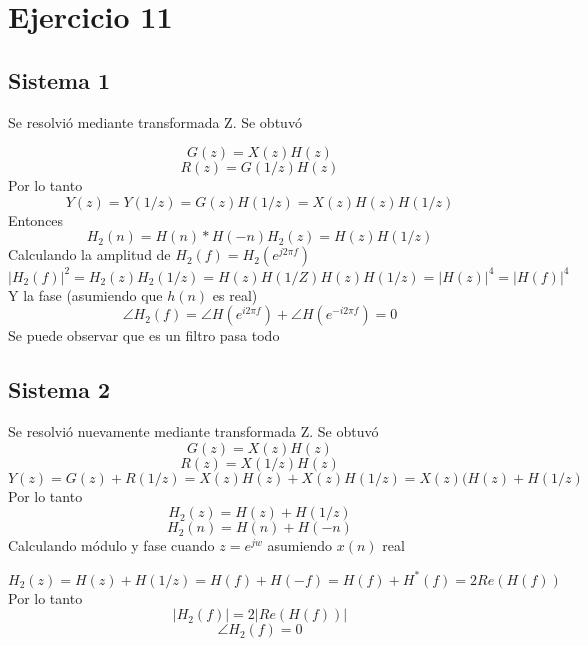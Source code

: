 \documentclass[assd_guia_filtros_recursivos_main.tex]{subfiles}
\begin{document}
\section{Ejercicio 11}

\subsection{Sistema 1}

Se resolvió mediante transformada Z. Se obtuvó

\begin{equation}
G(z)=X(z)H(z)
\end{equation}
\begin{equation}
R(z)=G(1/z)H(z)
\end{equation}
Por lo tanto
\begin{equation}
Y(z)=Y(1/z)=G(z)H(1/z)=X(z)H(z)H(1/z)
\end{equation}
Entonces
\begin{equation}
H_2(n)=H(n)*H(-n)
H_2(z)=H(z)H(1/z)
\end{equation}
Calculando la amplitud de $H_2(f)=H_2(e^{j2\pi f})$
\begin{equation}
|H_2(f)|^2=H_2(z)H_2(1/z)=H(z)H(1/Z)H(z)H(1/z)=|H(z)|^4=|H(f)|^4
\end{equation}
Y la fase (asumiendo que $h(n)$ es real)
\begin{equation}
\angle H_2(f)= \angle H(e^{i2\pi f}) + \angle H(e^{-i2\pi f}) = 0
\end{equation}
Se puede observar que es un filtro pasa todo

\subsection{Sistema 2}

Se resolvió nuevamente mediante transformada Z. Se obtuvó
\begin{equation}
G(z)=X(z)H(z)
\end{equation}
\begin{equation}
R(z)=X(1/z)H(z)
\end{equation}
\begin{equation}
Y(z)=G(z)+R(1/z)=X(z)H(z)+X(z)H(1/z)=X(z)( H(z) + H(1/z)
\end{equation}
Por lo tanto
\begin{equation}
H_2(z)=H(z)+H(1/z)
\end{equation}
\begin{equation}
H_2(n)=H(n)+H(-n)
\end{equation}
Calculando módulo y fase cuando $z=e^{jw}$ asumiendo $x(n)$ real

\begin{equation}
H_2(z)=H(z)+H(1/z)=H(f)+H(-f)=H(f)+H^{*}(f)=2Re(H(f))
\end{equation}
Por lo tanto
\begin{equation}
|H_2(f)|=2|Re(H(f))|
\end{equation}
\begin{equation}
\angle H_2(f)=0
\end{equation}
\end{document}
